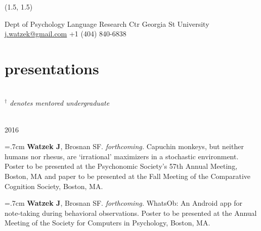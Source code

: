 \documentclass[]{friggeri-cv}
\begin{document}
\renewenvironment{aside}{%
  \let\oldsection\section
  \renewcommand{\section}[1]{
    \par\vspace{\baselineskip}{\Large\headingfont\color{headercolor} ##1}
  }
  \begin{textblock}{3.6}(1.5, 1.5)
  \begin{flushright}
  \obeycr
}{%
  \restorecr
  \end{flushright}
  \end{textblock}
  \let\section\oldsection
}


\begin{aside}
  \section{{\normalfont julia}watzek}
    Dept of Psychology
    Language Research Ctr
    Georgia St University
    ~
    \href{mailto:j.watzek@gmail.com}{j.watzek@gmail.com}
    +1 (404) 840-6838
\end{aside}


\section{presentations} ~\\[-1.3cm]

\hspace{.35cm} {\small{} \emph{${}^\dagger$ denotes mentored undergraduate}}

{\large{} ~\\[-.15cm] 2016}

\hangindent=.7cm \textbf{Watzek J}, Brosnan SF. \emph{forthcoming.} Capuchin monkeys, but neither humans nor rhesus, are `irrational' maximizers in a stochastic environment. Poster to be presented at the Psychonomic Society's 57th Annual Meeting, Boston, MA and paper to be presented at the Fall Meeting of the Comparative Cognition Society, Boston, MA.

\hangindent=.7cm \textbf{Watzek J}, Brosnan SF. \emph{forthcoming.} WhatsOb: An Android app for note-taking during behavioral observations. Poster to be presented at the Annual Meeting of the Society for Computers in Psychology, Boston, MA.
\end{document}
